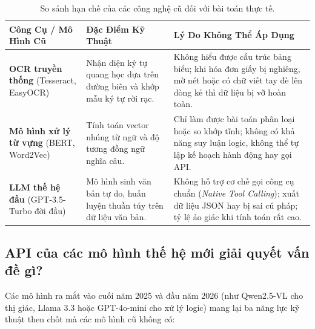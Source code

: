 \documentclass[11pt,a4paper]{article}
\begin{document}
\begin{table}[H]
\centering
\small
\renewcommand{\arraystretch}{1.25}
\begin{tabularx}{\textwidth}{p{3.8cm} p{5.5cm} >{\raggedright\arraybackslash}X}
\toprule
\textbf{Công Cụ / Mô Hình Cũ} & \textbf{Đặc Điểm Kỹ Thuật} & \textbf{Lý Do Không Thể Áp Dụng} \\
\midrule
\textbf{OCR truyền thống} \newline (Tesseract, EasyOCR) & Nhận diện ký tự quang học dựa trên đường biên và khớp mẫu ký tự rời rạc. & Không hiểu được cấu trúc bảng biểu; khi hóa đơn giấy bị nghiêng, mờ nét hoặc có chữ viết tay đè lên dòng kẻ thì dữ liệu bị vỡ hoàn toàn. \\
\addlinespace
\textbf{Mô hình xử lý từ vựng} \newline (BERT, Word2Vec) & Tính toán vector nhúng từ ngữ và độ tương đồng ngữ nghĩa câu. & Chỉ làm được bài toán phân loại hoặc so khớp tĩnh; không có khả năng suy luận logic, không thể tự lập kế hoạch hành động hay gọi API. \\
\addlinespace
\textbf{LLM thế hệ đầu} \newline (GPT-3.5-Turbo đời đầu) & Mô hình sinh văn bản tự do, huấn luyện thuần túy trên dữ liệu văn bản. & Không hỗ trợ cơ chế gọi công cụ chuẩn (\textit{Native Tool Calling}); xuất dữ liệu JSON hay bị sai cú pháp; tỷ lệ ảo giác khi tính toán rất cao. \\
\bottomrule
\end{tabularx}
\caption{So sánh hạn chế của các công nghệ cũ đối với bài toán thực tế.}
\end{table}

\subsection{API của các mô hình thế hệ mới giải quyết vấn đề gì?}
Các mô hình ra mắt vào cuối năm 2025 và đầu năm 2026 (như Qwen2.5-VL cho thị giác, Llama 3.3 hoặc GPT-4o-mini cho xử lý logic) mang lại ba năng lực kỹ thuật then chốt mà các mô hình cũ không có:
\end{document}
